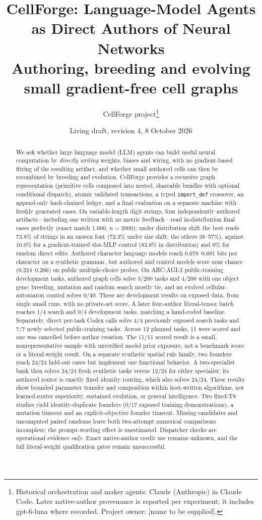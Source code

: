 \documentclass[11pt]{article}
\title{CellForge: Language-Model Agents as Direct Authors of Neural Networks\\
\large Authoring, breeding and evolving small gradient-free cell graphs}
\author{CellForge project\thanks{Historical orchestration and maker agents: Claude (Anthropic) in Claude Code. Later native-author provenance is reported per experiment; it includes gpt-6-luna where recorded. Project owner: [name to be supplied].}}
\date{Living draft, revision 4, 8 October 2026}
\begin{document}
\maketitle

\begin{abstract}
We ask whether large language model (LLM) agents can build useful neural computation by
\emph{directly writing} weights, biases and wiring, with no gradient-based fitting of the
resulting artifact, and whether small authored cells can then be recombined by breeding and
evolution. CellForge provides a recursive graph representation (primitive cells composed into
nested, shareable bundles with optional conditional dispatch), atomic validated transactions,
a typed \texttt{import\_def} crossover, an append-only hash-chained ledger, and a final
evaluation on a separate machine with freshly generated cases.
On variable-length digit strings, four independently authored artifacts---including one
written with no metric feedback---read in-distribution final cases perfectly (exact match
1.000, $n=2000$); under distribution shift the best reads 73.8\% of strings in an unseen font (72.3\% under size shift; the others 38--57\%),
against 10.0\% for a gradient-trained slot-MLP control (83.8\% in distribution) and 0\% for random direct edits.
Authored character language models reach 0.678--0.681 bits per character on a synthetic
grammar, but authored and control models score near chance (0.224--0.266) on public
multiple-choice probes. On ARC-AGI-2 public-training development tasks, authored
graph cells solve 3/200 tasks and 4/200 with one object gene; breeding, mutation and random search
mostly tie, and an evolved cellular-automaton control solves 0/40. These are development
results on exposed data, from single small runs, with no private-set score. A later four-author
literal-tensor batch reaches 1/4 search and 0/4 development tasks, matching a hand-coded baseline.
Separately, direct per-task Codex calls solve 4/4 previously exposed search tasks and 7/7
newly selected public-training tasks. Across 12 planned tasks, 11 were scored and one was
cancelled before author creation. The 11/11 scored result is a small, nonrepresentative sample
with unverified model prior exposure, not a benchmark score or a literal-weight result.
On a separate synthetic spatial rule family, two founders reach 24/24 held-out cases but implement
one functional behavior. A two-specialist bank then solves 24/24 fresh synthetic tasks versus
12/24 for either specialist; its authored router is exactly fixed identity routing, which also
solves 24/24. These results show bounded parameter transfer and composition within host-written
algorithms, not learned-router superiority, sustained evolution, or general intelligence.
Two fixed-T8 studies yield identity-duplicate founders (0/17 exposed training demonstrations),
a mutation timeout and an explicit-objective founder timeout. Missing candidates and uncomputed
paired randoms leave both two-attempt numerical comparisons incomplete; the prompt-wording effect
is unestimated.
Dispatcher checks are operational evidence only. Exact native-author credit use remains unknown,
and the full literal-weight qualification gates remain unsuccessful.
\end{abstract}
\end{document}

